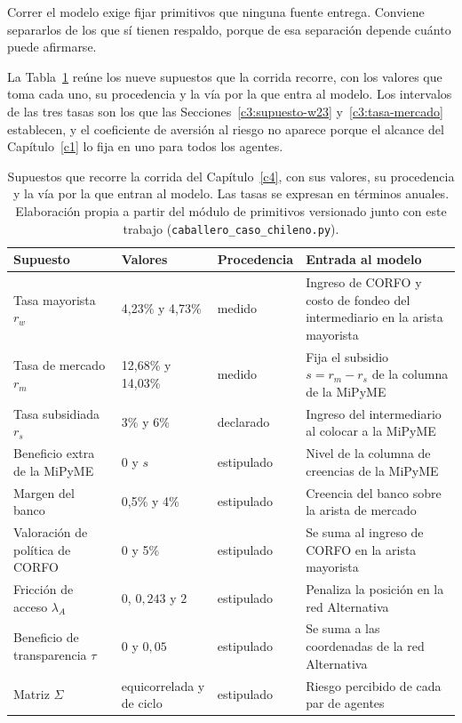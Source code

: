 Correr el modelo exige fijar primitivos que ninguna fuente entrega. Conviene separarlos de los que sí tienen respaldo, porque de esa separación depende cuánto puede afirmarse.

La Tabla~\ref{tab:rejilla-supuestos} reúne los nueve supuestos que la corrida recorre, con los valores que toma cada uno, su procedencia y la vía por la que entra al modelo. Los intervalos de las tres tasas son los que las Secciones~\ref{c3:supuesto-w23} y~\ref{c3:tasa-mercado} establecen, y el coeficiente de aversión al riesgo no aparece porque el alcance del Capítulo~\ref{c1} lo fija en uno para todos los agentes.

\begin{table}[htbp]
\centering
\small
\caption[Rejilla de supuestos de la corrida]{Supuestos que recorre la corrida del Capítulo~\ref{c4}, con sus valores, su procedencia y la vía por la que entran al modelo. Las tasas se expresan en términos anuales. Elaboración propia a partir del módulo de primitivos versionado junto con este trabajo (\texttt{caballero\_caso\_chileno.py}).}
\label{tab:rejilla-supuestos}
\begin{tabular}{p{3.0cm}p{2.7cm}p{1.9cm}p{5.0cm}}
\hline
Supuesto & Valores & Procedencia & Entrada al modelo \\
\hline
Tasa mayorista $r_w$ & 4,23\% y 4,73\% & medido & Ingreso de CORFO y costo de fondeo del intermediario en la arista mayorista \\
Tasa de mercado $r_m$ & 12,68\% y 14,03\% & medido & Fija el subsidio $s = r_m - r_s$ de la columna de la MiPyME \\
Tasa subsidiada $r_s$ & 3\% y 6\% & declarado & Ingreso del intermediario al colocar a la MiPyME \\
Beneficio extra de la MiPyME & $0$ y $s$ & estipulado & Nivel de la columna de creencias de la MiPyME \\
Margen del banco & 0,5\% y 4\% & estipulado & Creencia del banco sobre la arista de mercado \\
Valoración de política de CORFO & $0$ y 5\% & estipulado & Se suma al ingreso de CORFO en la arista mayorista \\
Fricción de acceso $\lambda_A$ & $0$, $0{,}243$ y $2$ & estipulado & Penaliza la posición en la red Alternativa \\
Beneficio de transparencia $\tau$ & $0$ y $0{,}05$ & estipulado & Se suma a las coordenadas de la red Alternativa \\
Matriz $\Sigma$ & equicorrelada y de ciclo & estipulado & Riesgo percibido de cada par de agentes \\
\hline
\end{tabular}
\end{table}

